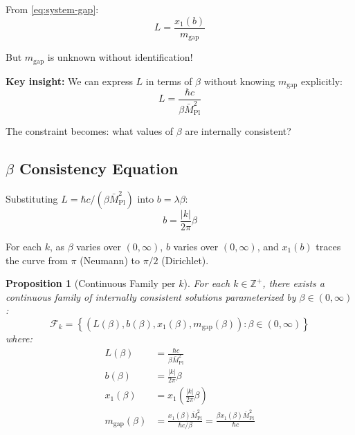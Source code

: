 \documentclass[11pt,a4paper]{article}
\newtheorem{proposition}[theorem]{Proposition}
\begin{document}
From \eqref{eq:system-gap}:
\begin{equation}
  L = \frac{x_1(b)}{m_{\text{gap}}}
  \label{eq:L-from-gap}
\end{equation}

But $m_{\text{gap}}$ is unknown without identification!

\textbf{Key insight:} We can express $L$ in terms of $\beta$ without knowing
$m_{\text{gap}}$ explicitly:
\begin{equation}
  L = \frac{\hbar c}{\beta \bar{M}_{\text{Pl}}^2}
  \label{eq:L-from-beta-redux}
\end{equation}

The constraint becomes: what values of $\beta$ are internally consistent?

\subsection{$\beta$ Consistency Equation}

Substituting $L = \hbar c / (\beta \bar{M}_{\text{Pl}}^2)$ into $b = \lambda \beta$:
\begin{equation}
  b = \frac{|k|}{2\pi} \beta
  \label{eq:b-from-beta-k}
\end{equation}

For each $k$, as $\beta$ varies over $(0, \infty)$, $b$ varies over $(0, \infty)$,
and $x_1(b)$ traces the curve from $\pi$ (Neumann) to $\pi/2$ (Dirichlet).

\begin{proposition}[Continuous Family per $k$]
\label{prop:continuous-family}
For each $k \in \mathbb{Z}^+$, there exists a continuous family of internally
consistent solutions parameterized by $\beta \in (0, \infty)$:
\begin{equation}
  \mathcal{F}_k = \left\{ \left( L(\beta), b(\beta), x_1(\beta), m_{\text{gap}}(\beta) \right)
                 : \beta \in (0, \infty) \right\}
  \label{eq:family-k}
\end{equation}
where:
\begin{align}
  L(\beta) &= \frac{\hbar c}{\beta \bar{M}_{\text{Pl}}^2}
  \label{eq:family-L} \\
  b(\beta) &= \frac{|k|}{2\pi} \beta
  \label{eq:family-b} \\
  x_1(\beta) &= x_1\left( \frac{|k|}{2\pi} \beta \right)
  \label{eq:family-x1} \\
  m_{\text{gap}}(\beta) &= \frac{x_1(\beta) \bar{M}_{\text{Pl}}^2}{\hbar c / \beta}
                        = \frac{\beta x_1(\beta) \bar{M}_{\text{Pl}}^2}{\hbar c}
  \label{eq:family-mgap}
\end{align}
\end{proposition}
\end{document}
